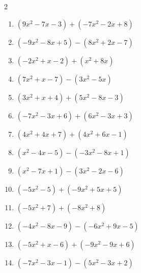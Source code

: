 \begin{multicols}{2}
\begin{enumerate}
  \item $(9x^{2}-7x-3)+(-7x^{2}-2x+8)$


  \item $(-9x^{2}-8x+5)-(8x^{2}+2x-7)$


  \item $(-2x^{2}+x-2)+(x^{2}+8x)$


  \item $(7x^{2}+x-7)-(3x^{2}-5x)$


  \item $(3x^{2}+x+4)+(5x^{2}-8x-3)$


  \item $(-7x^{2}-3x+6)+(6x^{2}-3x+3)$


  \item $(4x^{2}+4x+7)+(4x^{2}+6x-1)$


  \item $(x^{2}-4x-5)-(-3x^{2}-8x+1)$


  \item $(x^{2}-7x+1)-(3x^{2}-2x-6)$


  \item $(-5x^{2}-5)+(-9x^{2}+5x+5)$


  \item $(-5x^{2}+7)+(-8x^{2}+8)$


  \item $(-4x^{2}-8x-9)-(-6x^{2}+9x-5)$


  \item $(-5x^{2}+x-6)+(-9x^{2}-9x+6)$


  \item $(-7x^{2}-3x-1)-(5x^{2}-3x+2)$


\end{enumerate}
\end{multicols}
